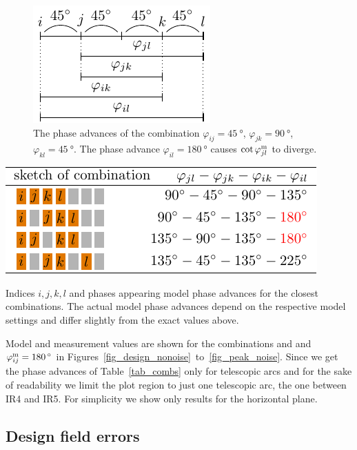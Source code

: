 \begin{figure}
  \centering
  \includegraphics[width=.3\linewidth]{figThetacombijkl}
  \caption{The phase advances of the combination
    $\varphi_{ij}=\SI{45}{\degree}$, $\varphi_{jk}=\SI{90}{\degree}$, $ \varphi_{kl}=\SI{45}{\degree}$.
The phase advance $\varphi_{il} = \SI{180}{\degree}$ causes $\cot\varphi_{jl}^\text{m}$ to diverge.
  }
  \label{fig_thetacomb_ij-kl}
\end{figure}

\begin{table}[htbp]
    \begin{center}
    \includegraphics{figTable1}
    \end{center}
    \caption{Indices $i,j,k,l$ and phases appearing model phase advances for the closest combinations.
      The actual model phase advances depend on the respective model settings and differ slightly from
      the exact values above.
    }
    \label{tab_combs}
\end{table}

Model and measurement values are shown for the combinations  and
 and $\varphi_{ij}^\text{m} = \SI{180}{^\circ}$ in Figures~\ref{fig_design_nonoise}~to~\ref{fig_peak_noise}.
Since we get the phase advances of Table~\ref{tab_combs} only for telescopic arcs and for the sake
of readability we limit the plot region to just one telescopic arc, the one between IR4 and IR5.
For simplicity we show only results for the horizontal plane. 


\subsection{Design field errors}

